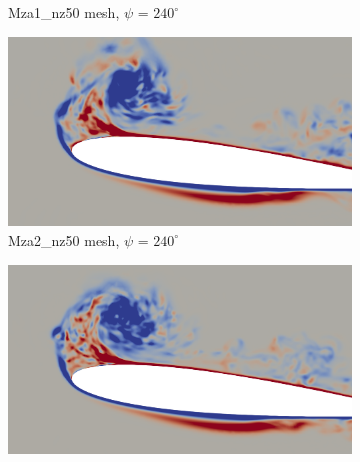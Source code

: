\begin{figure}[H]
\begin{subfigure}[b]{0.475\textwidth}
	\caption{Mza1\_nz50 mesh, $\psi$ = $240^\circ$}
	\label{fig:Mza1_50_sp_psi240}
	\end{subfigure}
	\begin{subfigure}[b]{0.475\textwidth}
		\centering
		\includegraphics[width=1\textwidth]{figures/zonal_adapt_results/vorticity_plots/v2/Mza2_50/spavg/phase_240.png}
		\caption{Mza2\_nz50 mesh, $\psi$ = $240^\circ$}
		\label{fig:Mza2_50_sp_psi240}
	\end{subfigure}
	\begin{subfigure}[b]{0.475\textwidth}
		\centering
		\includegraphics[width=1\textwidth]{figures/zonal_adapt_results/vorticity_plots/v2/Mza2_100/spavg/phase_240.png}

\end{subfigure}
\end{figure}
